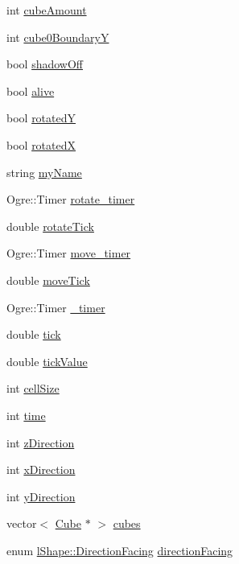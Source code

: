 \begin{DoxyCompactItemize}
\item 
int \hyperlink{classl_shape_abae09efbbd20c715443d301ac1f6ba11}{cube\-Amount}
\item 
int \hyperlink{classl_shape_a2be443ca8dc155a976e1681b7bb24fc1}{cube0\-Boundary\-Y}
\item 
bool \hyperlink{classl_shape_a980e4a6708978a6427733e52872dbfbf}{shadow\-Off}
\item 
bool \hyperlink{classl_shape_ab9c57360b754bd499a55074a29437f5e}{alive}
\item 
bool \hyperlink{classl_shape_a5f7fc7e485ba77a6da02cafe7051e80e}{rotated\-Y}
\item 
bool \hyperlink{classl_shape_aeeabb04f47a8d183936e22fc2f42bbf4}{rotated\-X}
\item 
string \hyperlink{classl_shape_a1bb0113067c1604bfe18713d78722b7e}{my\-Name}
\item 
Ogre\-::\-Timer \hyperlink{classl_shape_af2516a8beb39e1a722ddb421199a23b0}{rotate\-\_\-timer}
\item 
double \hyperlink{classl_shape_a68fae9e0f7829a2fc5199e02fa6f8484}{rotate\-Tick}
\item 
Ogre\-::\-Timer \hyperlink{classl_shape_a0bceedaef75e72ab4d7a370029aacf79}{move\-\_\-timer}
\item 
double \hyperlink{classl_shape_ae5a4cca2d42185cdac54913c4a441e55}{move\-Tick}
\item 
Ogre\-::\-Timer \hyperlink{classl_shape_a04043b68e92f96f681a82cbcaea48663}{\-\_\-timer}
\item 
double \hyperlink{classl_shape_a64a64d6d07aa239f0b09f28d00e2d0d5}{tick}
\item 
double \hyperlink{classl_shape_a0168327856f77c68a8e7a5c15177778e}{tick\-Value}
\item 
int \hyperlink{classl_shape_aa3d3ef832437b8cfd098fb0138884b48}{cell\-Size}
\item 
int \hyperlink{classl_shape_ad42de6d6c7dbb5adbadeb3b6e665acbc}{time}
\item 
int \hyperlink{classl_shape_a3eccc5e34adeca221972a4cb19e65b57}{z\-Direction}
\item 
int \hyperlink{classl_shape_a62f7483b65ac40883ec0f964869dc8c9}{x\-Direction}
\item 
int \hyperlink{classl_shape_aefae6d46cb0caeff1eb58f91e7b8f092}{y\-Direction}
\item 
vector$<$ \hyperlink{class_cube}{Cube} $\ast$ $>$ \hyperlink{classl_shape_a8606e1412da87e60c1fcf23205afb924}{cubes}
\item 
enum \hyperlink{classl_shape_a2cebf3a21f1b4703f209447f1a226b50}{l\-Shape\-::\-Direction\-Facing} \hyperlink{classl_shape_a5d3ac0cd0ad9d24ef0e2efed9b4cf1f9}{direction\-Facing}
\end{DoxyCompactItemize}


